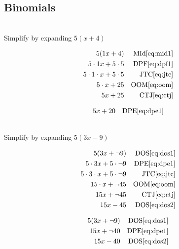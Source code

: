 \documentclass[20150903-160354-rs2.2-MarksMathNotebook.tex]{subfiles}
\begin{document}
\subsection*{Binomials}


\begin{example}[id:20141109-090809] \label{20141109-090809}  \hfill \\

Simplify by expanding $5(x+4)$

\soln

\solnsteps
\begin{align*}
5(1x+4) && \text{MId} \eqref{eq:mid1} \\
5 \cdot 1x + 5 \cdot 5 && \text{DPF} \eqref{eq:dpf1} \\
5 \cdot 1 \cdot x + 5 \cdot 5 && \text{JTC} \eqref{eq:jtc} \\
5 \cdot x + 25  && \text{OOM} \eqref{eq:oom} \\
5x + 25  && \text{CTJ} \eqref{eq:ctj}
\end{align*}

\soln

\lesssteps
\begin{align*}
5x + 20 && \text{DPE} \eqref{eq:dpe1}
\end{align*}

\end{example}

\begin{example}[id:20141109-091015] \label{20141109-091015}  \hfill \\

Simplify by expanding $5(3x-9)$

\soln

\solnsteps
\begin{align*}
5(3x+ \neg 9)  && \text{DOS} \eqref{eq:dos1} \\
5 \cdot 3x + 5 \cdot \neg 9  && \text{DPE} \eqref{eq:dpe1} \\
5 \cdot 3 \cdot x + 5 \cdot \neg 9  && \text{JTC} \eqref{eq:jtc} \\
15 \cdot x + \neg 45  && \text{OOM} \eqref{eq:oom} \\
15x + \neg 45  && \text{CTJ} \eqref{eq:ctj} \\
15x - 45  && \text{DOS} \eqref{eq:dos2}
\end{align*}

\soln

\lesssteps
\begin{align*}
5(3x+\neg 9) && \text{DOS} \eqref{eq:dos1} \\
15x+ \neg 40 && \text{DPE} \eqref{eq:dpe1} \\
15x-40 && \text{DOS} \eqref{eq:dos2}
\end{align*}

\end{example}
\end{document}
